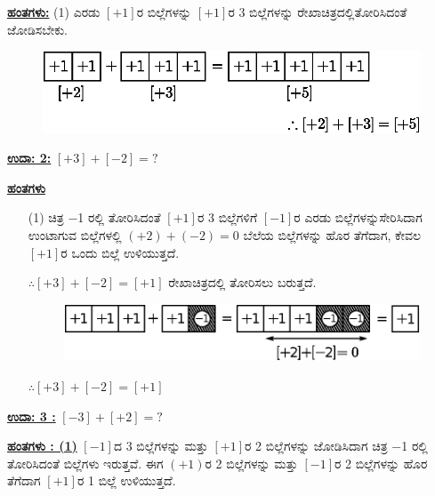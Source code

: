 \noindent
{\textbf{\underline{ಹಂತಗಳು:}}} (1) ಎರಡು $[+1]$ರ ಬಿಲ್ಲೆಗಳನ್ನು $[+1]$ರ 3 ಬಿಲ್ಲೆಗಳನ್ನು ರೇಖಾಚಿತ್ರದಲ್ಲಿ\break ತೋರಿಸಿದಂತೆ ಜೋಡಿಸಬೇಕು.

\begin{figure}[H]
\centering
\includegraphics[scale=0.8]{src/figure/chap3/fig3-8b.eps}
\end{figure}


\noindent
{\textbf{\underline{ಉದಾ: 2:}}} $[+3] + [-2] = ?$

\noindent
{\textbf{\underline{ಹಂತಗಳು}}} 
\begin{itemize}
\item[(1)] ಚಿತ್ರ $-$1 ರಲ್ಲಿ ತೋರಿಸಿದಂತೆ $[+1]$ರ 3 ಬಿಲ್ಲೆಗಳಿಗೆ $[-1]$ರ ಎರಡು ಬಿಲ್ಲೆಗಳನ್ನು\break ಸೇರಿಸಿದಾಗ ಉಂಟಾಗುವ ಬಿಲ್ಲೆಗಳಲ್ಲಿ $(+2) + (-2) = 0$ ಬೆಲೆಯ ಬಿಲ್ಲೆಗಳನ್ನು ಹೊರ ತೆಗೆದಾಗ, ಕೇವಲ $[+1]$ರ ಒಂದು ಬಿಲ್ಲೆ ಉಳಿಯುತ್ತದೆ.

$\therefore [+3] + [-2] = [+1]$ ರೇಖಾಚಿತ್ರದಲ್ಲಿ ತೋರಿಸಲು ಬರುತ್ತದೆ.
\begin{figure}[H]
\centering
\includegraphics[scale=0.8]{src/figure/chap3/fig3-9b.eps}
\end{figure}

$\therefore [+3] + [-2] = [+1]$
\end{itemize}

\medskip
\noindent
{\textbf{\underline{ಉದಾ: 3 :}}} $[-3] + [+2] = ?$

\noindent
{\textbf{\underline{ಹಂತಗಳು : (1)}}}  $[-1]$ದ 3 ಬಿಲ್ಲೆಗಳನ್ನು ಮತ್ತು $[+1]$ರ 2 ಬಿಲ್ಲೆಗಳನ್ನು ಜೋಡಿಸಿದಾಗ ಚಿತ್ರ $-$1 ರಲ್ಲಿ ತೋರಿಸಿದಂತೆ ಬಿಲ್ಲೆಗಳು ಇರುತ್ತವೆ. ಈಗ $(+1)$ರ 2 ಬಿಲ್ಲೆಗಳನ್ನು ಮತ್ತು $[-1]$ರ 2 ಬಿಲ್ಲೆಗಳನ್ನು ಹೊರ ತೆಗೆದಾಗ $[+1]$ರ 1 ಬಿಲ್ಲೆ ಉಳಿಯುತ್ತದೆ.

